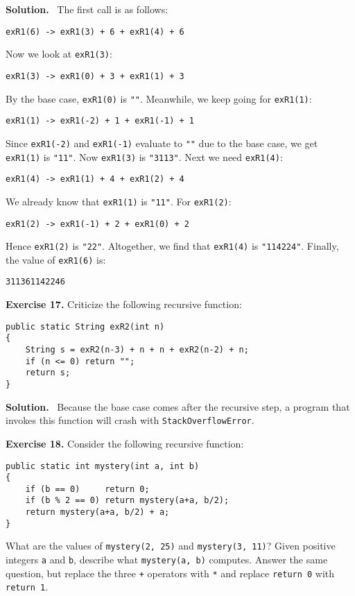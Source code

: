 \documentclass[12pt, a4paper]{article}
\newenvironment{ex}[2][Exercise]
{\par\medskip\noindent \textbf{#1 #2.}}
{\medskip}
\newenvironment{sol}[1][Solution]
{\par\medskip\noindent \textbf{#1.} }
{\medskip}
\begin{document}
	\begin{sol}
		\
			The first call is as follows:
		\begin{lstlisting}[language={}]
exR1(6) -> exR1(3) + 6 + exR1(4) + 6
		\end{lstlisting}
		Now we look at \texttt{exR1(3)}:
		\begin{lstlisting}[language={}]
exR1(3) -> exR1(0) + 3 + exR1(1) + 3
		\end{lstlisting}
		By the base case, \texttt{exR1(0)} is \texttt{""}. Meanwhile, we keep going for \texttt{exR1(1)}:
		\begin{lstlisting}[language={}]
exR1(1) -> exR1(-2) + 1 + exR1(-1) + 1
		\end{lstlisting}
		Since \texttt{exR1(-2)} and \texttt{exR1(-1)} evaluate to \texttt{""} due to the
		base case, we get \texttt{exR1(1)} is \texttt{"11"}. Now \texttt{exR1(3)} is \texttt{"3113"}.
		Next we need \texttt{exR1(4)}:
		\begin{lstlisting}[language={}]
exR1(4) -> exR1(1) + 4 + exR1(2) + 4
		\end{lstlisting}
		We already know that \texttt{exR1(1)} is \texttt{"11"}. For \texttt{exR1(2)}:
		\begin{lstlisting}[language={}]
exR1(2) -> exR1(-1) + 2 + exR1(0) + 2
		\end{lstlisting}
		Hence \texttt{exR1(2)} is \texttt{"22"}. Altogether, we find that \texttt{exR1(4)} is
		\texttt{"114224"}. Finally, the value of \texttt{exR1(6)} is:
		\begin{lstlisting}[language={}]
311361142246
		\end{lstlisting}
	\end{sol}
	\begin{ex}{17}
		Criticize the following recursive function:
		\begin{lstlisting}
public static String exR2(int n)
{
	String s = exR2(n-3) + n + n + exR2(n-2) + n;
	if (n <= 0) return "";
	return s;
}
		\end{lstlisting}
	\end{ex}
	\begin{sol}
		\
		Because the base case comes after the recursive step, a program that invokes this
		function will crash with \texttt{StackOverflowError}.
	\end{sol}
	\begin{ex}{18}
		Consider the following recursive function:
		\begin{lstlisting}
public static int mystery(int a, int b)
{
	if (b == 0)		return 0;
	if (b % 2 == 0)	return mystery(a+a, b/2);
	return mystery(a+a, b/2) + a;
}
		\end{lstlisting}
	What are the values of \texttt{mystery(2, 25)} and \texttt{mystery(3, 11)}? Given positive integers
	\texttt{a} and \texttt{b}, describe what \texttt{mystery(a, b)} computes. Answer the same
	question, but replace the three \texttt{+} operators with \texttt{*} and replace
	\texttt{return 0} with \texttt{return 1}.
	\end{ex}
\end{document}
